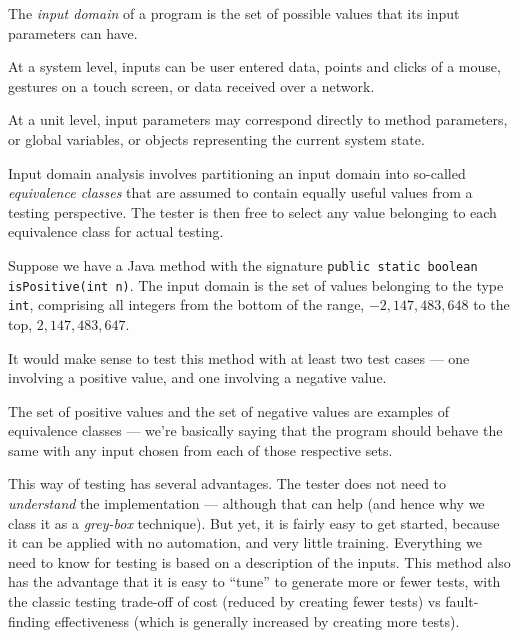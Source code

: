 
The {\it input domain} of a program is the set of possible values that its input
parameters can have. 

At a system level, inputs can be user entered data, points and clicks of a
mouse, gestures on a touch screen, or data received over a network.


At a unit level, input parameters may correspond directly to method parameters,
or global variables, or objects representing the current system state. 


Input domain analysis involves partitioning an input domain into so-called {\it
equivalence classes} that are assumed to contain equally useful values from a
testing perspective. The tester is then free to select any value belonging to
each equivalence class for actual testing. 


Suppose we have a Java method with the signature {\tt public static boolean
isPositive(int n)}. The input domain is the set of values belonging to the type
{\tt int}, comprising all integers from the bottom of the range, $-2,147,483,648$
to the top, $2,147,483,647$. 


It would make sense to test this method with at
least two test cases --- one involving a positive value, and one involving a
negative value. 


The set of positive values and the set of negative values are examples of
equivalence classes --- we're basically saying that the program should behave
the same with any input chosen from each of those respective sets.

This way of testing has several advantages. The tester does not need to {\it
understand} the implementation --- although that can help (and hence why we
class it as a {\it grey-box} technique). But yet, it is fairly easy to get
started, because it can be applied with no automation, and very little training.
Everything we need to know for testing is based on a description of the inputs.
This method also has the advantage that it is easy to ``tune'' to generate more
or fewer tests, with the classic testing trade-off of cost (reduced by creating
fewer tests) vs fault-finding effectiveness (which is generally increased by
creating more tests).

